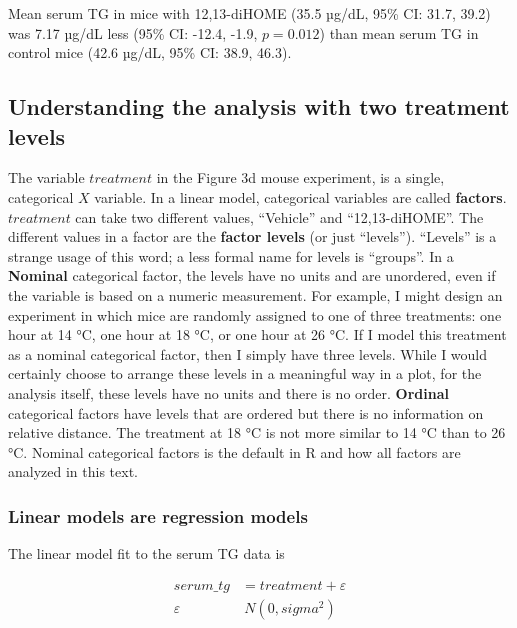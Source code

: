 \documentclass[]{book}
\begin{document}
Mean serum TG in mice with 12,13-diHOME (35.5 µg/dL, 95\% CI: 31.7, 39.2) was 7.17 µg/dL less (95\% CI: -12.4, -1.9, \(p = 0.012\)) than mean serum TG in control mice (42.6 µg/dL, 95\% CI: 38.9, 46.3).

\hypertarget{understanding-the-analysis-with-two-treatment-levels}{%
\subsection{Understanding the analysis with two treatment levels}\label{understanding-the-analysis-with-two-treatment-levels}}

The variable \(treatment\) in the Figure 3d mouse experiment, is a single, categorical \(X\) variable. In a linear model, categorical variables are called \textbf{factors}. \(treatment\) can take two different values, ``Vehicle'' and ``12,13-diHOME''. The different values in a factor are the \textbf{factor levels} (or just ``levels''). ``Levels'' is a strange usage of this word; a less formal name for levels is ``groups''. In a \textbf{Nominal} categorical factor, the levels have no units and are unordered, even if the variable is based on a numeric measurement. For example, I might design an experiment in which mice are randomly assigned to one of three treatments: one hour at 14 °C, one hour at 18 °C, or one hour at 26 °C. If I model this treatment as a nominal categorical factor, then I simply have three levels. While I would certainly choose to arrange these levels in a meaningful way in a plot, for the analysis itself, these levels have no units and there is no order. \textbf{Ordinal} categorical factors have levels that are ordered but there is no information on relative distance. The treatment at 18 °C is not more similar to 14 °C than to 26 °C. Nominal categorical factors is the default in R and how all factors are analyzed in this text.

\hypertarget{linear-models-are-regression-models}{%
\subsubsection{Linear models are regression models}\label{linear-models-are-regression-models}}

The linear model fit to the serum TG data is

\begin{align}
serum\_tg &= treatment + \varepsilon\\
\varepsilon &~ N(0, sigma^2)
\label{eq:lm-serum-tg}
\end{align}
\end{document}
